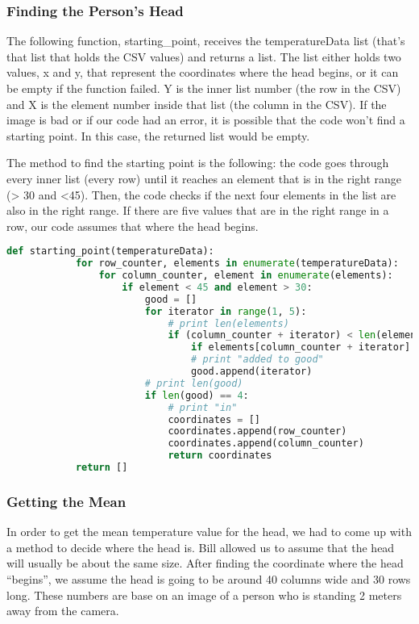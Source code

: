 	
\subsubsection*{Finding the Person’s Head}
	The following function, starting\_point, receives the temperatureData list (that’s that list that holds the CSV values) and returns a list. The list either holds two values, x and y, that represent the coordinates where the head begins, or it can be empty if the function failed. Y is the inner list number (the row in the CSV) and X is the element number inside that list (the column in the CSV). If the image is bad or if our code had an error, it is possible that the code won’t find a starting point. In this case, the returned list would be empty. 
	
	The method to find the starting point is the following: the code goes through every inner list (every row) until it reaches an element that is in the right range (> 30 and <45). Then, the code checks if the next four elements in the list are also in the right range. If there are five values that are in the right range in a row, our code assumes that where the head begins. 
	
	\begin{lstlisting}[language=Python, caption=Finding the persons head in the picture]
		def starting_point(temperatureData):
			for row_counter, elements in enumerate(temperatureData):
				for column_counter, element in enumerate(elements):
					if element < 45 and element > 30:
						good = []
						for iterator in range(1, 5):
							# print len(elements)
							if (column_counter + iterator) < len(elements):
								if elements[column_counter + iterator] < 45 and elements[column_counter + iterator] > 30:
								# print "added to good"
								good.append(iterator)
						# print len(good)
						if len(good) == 4:
							# print "in"
							coordinates = []
							coordinates.append(row_counter)
							coordinates.append(column_counter)
							return coordinates
			return []
	\end{lstlisting}
	
	
	
\subsubsection*{Getting the Mean }
	In order to get the mean temperature value for the head, we had to come up with a method to decide where the head is. Bill allowed us to assume that the head will usually be about the same size. After finding the coordinate where the head “begins”, we assume the head is going to be around 40 columns wide and 30 rows long. These numbers are base on an image of a person who is standing 2 meters away from the camera. 
	
